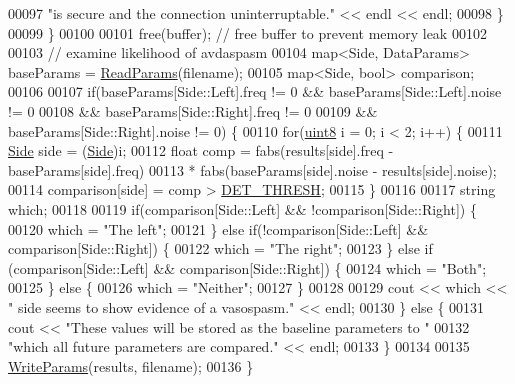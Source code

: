 \begin{DoxyCode}
00097                 \textcolor{stringliteral}{"is secure and the connection uninterruptable."} << endl << endl;
00098         \}
00099     \}
00100 
00101     free(buffer);  \textcolor{comment}{// free buffer to prevent memory leak}
00102 
00103     \textcolor{comment}{// examine likelihood of avdaspasm}
00104     map<Side, DataParams> baseParams = \hyperlink{namespaceavda_a46dc980b65ddfc24749ce25c1290e158}{ReadParams}(filename);
00105     map<Side, bool> comparison;
00106 
00107     \textcolor{keywordflow}{if}(baseParams[Side::Left].freq != 0 && baseParams[Side::Left].noise != 0
00108             && baseParams[Side::Right].freq != 0
00109             && baseParams[Side::Right].noise != 0) \{
00110         \textcolor{keywordflow}{for}(\hyperlink{definitions_8hpp_adde6aaee8457bee49c2a92621fe22b79}{uint8} i = 0; i < 2; i++) \{
00111             \hyperlink{namespaceavda_af723e82f0d3d45fda6fdc01f6a492786}{Side} side = (\hyperlink{namespaceavda_af723e82f0d3d45fda6fdc01f6a492786}{Side})i;
00112             \textcolor{keywordtype}{float} comp = fabs(results[side].freq - baseParams[side].freq) 
00113                 * fabs(baseParams[side].noise - results[side].noise);
00114             comparison[side] = comp > \hyperlink{definitions_8hpp_aa15adfcc96559f1b86210d217edd3afc}{DET\_THRESH};
00115         \}
00116 
00117         \textcolor{keywordtype}{string} which;
00118 
00119         \textcolor{keywordflow}{if}(comparison[Side::Left] && !comparison[Side::Right]) \{
00120             which = \textcolor{stringliteral}{"The left"};
00121         \} \textcolor{keywordflow}{else} \textcolor{keywordflow}{if}(!comparison[Side::Left] && comparison[Side::Right]) \{
00122             which = \textcolor{stringliteral}{"The right"};
00123         \} \textcolor{keywordflow}{else} \textcolor{keywordflow}{if} (comparison[Side::Left] && comparison[Side::Right]) \{
00124             which = \textcolor{stringliteral}{"Both"};
00125         \} \textcolor{keywordflow}{else} \{
00126             which = \textcolor{stringliteral}{"Neither"};
00127         \}
00128         
00129         cout << which << \textcolor{stringliteral}{" side seems to show evidence of a vasospasm."} << endl;
00130     \} \textcolor{keywordflow}{else} \{
00131         cout << \textcolor{stringliteral}{"These values will be stored as the baseline parameters to "}
00132             \textcolor{stringliteral}{"which all future parameters are compared."} << endl;
00133     \}
00134 
00135     \hyperlink{namespaceavda_a1e3f5a0eb4ee9a7010d57dc38bd8dfec}{WriteParams}(results, filename);
00136 \}
\end{DoxyCode}
